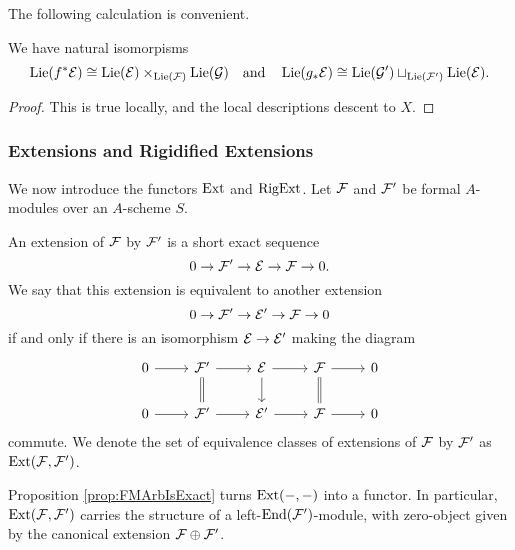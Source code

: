 \documentclass[../main.tex]{subfiles}
\begin{document}
The following calculation is convenient.
\begin{lem}\label{lem:LieAlgebrasOfPBandPFW}
  We have natural isomorpisms 
  \begin{equation*}
    \operatorname{Lie}(f^* \mathcal{E}) \cong \operatorname{Lie}(\mathcal{E}) \times_{\operatorname{Lie}(\mathcal{F})} \operatorname{Lie}(\mathcal{G}) \quad \text{and}
    \quad \operatorname{Lie}(g_* \mathcal{E}) \cong \operatorname{Lie}(\mathcal{G}') \sqcup_{\operatorname{Lie}(\mathcal{F}')} \operatorname{Lie}(\mathcal{E}).
  \end{equation*}
\begin{proof}
  This is true locally, and the local descriptions descent to $X$.
\end{proof}
\end{lem}


\subsubsection{Extensions and Rigidified Extensions} %
\label{ssub:Extensions and Rigidified Extensions}
We now introduce the functors $\operatorname{Ext}$ and $\operatorname {RigExt}$. 
Let $\mathcal{F}$ and $\mathcal{F}'$ be formal $A$-modules over an $A$-scheme $S$.
\begin{defi}[Extension]
  An extension of $\mathcal{F}$ by $\mathcal{F}'$ is a short exact sequence 
  \begin{equation*}
    0 \to \mathcal{F}' \to \mathcal{E} \to \mathcal{F} \to 0.
  \end{equation*}
  We say that this extension is equivalent to another extension 
  \begin{equation*}
    0 \to \mathcal{F}' \to \mathcal{E}' \to \mathcal{F} \to 0
  \end{equation*}
  if and only if there is an isomorphism $\mathcal{E} \to \mathcal{E}'$ making the diagram 
  \begin{equation*}
    \begin{tikzcd}[ampersand replacement=\&]
    	0 \& {\cF'} \& \cE \& \cF \& 0 \\
    	0 \& {\cF'} \& {\cE'} \& \cF \& 0
    	\arrow[from=1-1, to=1-2]
    	\arrow[from=1-2, to=1-3]
    	\arrow[Rightarrow, no head, from=1-2, to=2-2]
    	\arrow[from=1-3, to=1-4]
    	\arrow[from=1-3, to=2-3]
    	\arrow[from=1-4, to=1-5]
    	\arrow[Rightarrow, no head, from=1-4, to=2-4]
    	\arrow[from=2-1, to=2-2]
    	\arrow[from=2-2, to=2-3]
    	\arrow[from=2-3, to=2-4]
    	\arrow[from=2-4, to=2-5]
    \end{tikzcd}
  \end{equation*}
  commute. We denote the set of equivalence classes of extensions of $\mathcal{F}$ by
  $\mathcal{F}'$ as $\operatorname{Ext}(\mathcal{F}, \mathcal{F}')$. 
\end{defi}
Proposition \ref{prop:FMArbIsExact} turns $\operatorname{Ext}(-,-)$ into a functor.
In particular, $\operatorname{Ext}(\mathcal{F},\mathcal{F}')$ carries the structure of a
left-$\operatorname{End}(\mathcal{F}')$-module,
with zero-object given by the canonical extension $\mathcal{F} \oplus \mathcal{F}'$.
\end{document}
